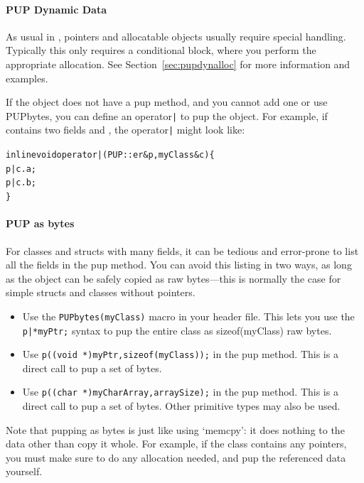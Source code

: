 \paragraph{PUP Dynamic Data}
As usual in \CC{}, pointers and allocatable objects usually require special handling. 
Typically this only requires a  conditional block, 
where you perform the appropriate allocation.  See 
Section~\ref{sec:pupdynalloc} for more information and examples.  

If the object does not have a pup method, and you cannot add one or use 
PUPbytes, you can define an operator\verb.|. to pup the object.
For example, if  contains two fields  and , the 
operator\verb.|. might look like:

\begin{alltt}
  inline void operator|(PUP::er &p,myClass &c) \{
    p|c.a;
    p|c.b;
  \}
\end{alltt}


\paragraph{PUP as bytes}

\label{sec:pupbytes}

For classes and structs with many fields, it can be tedious and 
error-prone to list all the fields in the pup method.
You can avoid this listing in two ways, as long as the
object can be safely copied as raw bytes---this is normally 
the case for simple structs and classes without pointers.

\begin{itemize}
\item Use the \verb.PUPbytes(myClass). macro in your header file.
      This lets you use the \verb.p|*myPtr;. syntax 
      to pup the entire class as sizeof(myClass) raw bytes.

\item Use \verb.p((void *)myPtr,sizeof(myClass));. in the pup 
      method.  This is a direct call to pup a set of bytes. 
      
\item Use \verb.p((char *)myCharArray,arraySize);. in the pup 
      method.  This is a direct call to pup a set of bytes. 
	  Other primitive types may also be used.
      
\end{itemize}

Note that pupping as bytes is just like using `memcpy': 
it does nothing to the data other than copy it whole.
For example, if the class contains any pointers, you
must make sure to do any allocation needed, and
pup the referenced data yourself.

